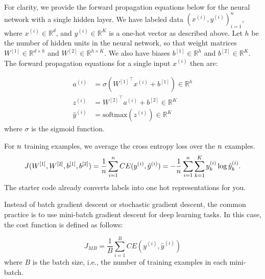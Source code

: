 For clarity, we provide the forward propagation equations below for the neural network with a single hidden layer. We have labeled data $(x^{(i)}, y^{(i)})_{i=1}^n$, where $x^{(i)} \in \mathbb{R}^d$, and $y^{(i)} \in \mathbb{R}^K$ is a one-hot vector as described above. Let $h$ be the number of hidden units in the neural network, so that weight matrices $W^{[1]} \in \mathbb{R}^{d \times h}$ and $W^{[2]} \in \mathbb{R}^{h \times K}$. We also have biases $b^{[1]} \in \mathbb{R}^h$ and $b^{[2]} \in \mathbb{R}^K$. The forward propagation equations for a single input $x^{(i)}$ then are:

\begin{align*}
  a^{(i)} &= \sigma \left( {W^{[1]}}^\top x^{(i)}  + b^{[1]} \right)  \in \mathbb{R}^h \\
  z^{(i) }&= {W^{[2]}}^\top a^{(i)} + b^{[2]} \in \mathbb{R}^K \\
  \hat{y}^{(i)} &=  \mathrm{softmax}(z^{(i)}) \in \mathbb{R}^K
\end{align*}
where $\sigma$ is the sigmoid function. 

For ${n}$ training examples, we average the cross entropy loss over the ${n}$ examples.
  \begin{equation*}
  J(W^{[1]},W^{[2]},b^{[1]},b^{[2]}) = \frac{1}{{n}}\sum_{i=1}^{n} CE(y^{(i)}, \hat{y}^{(i)}) = - \frac{1}{{n}}\sum_{i=1}^{n} \sum_{k=1}^K y_k^{(i)} \log \hat{y}_k^{(i)}.
  \end{equation*}
The starter code already converts labels into one hot representations for you.

Instead of batch gradient descent or stochastic gradient descent, the common practice
is to use mini-batch gradient descent for deep learning tasks. In this case, the
cost function is defined as follows:

  \begin{equation*}
  J_{MB} = \frac{1}{B}\sum_{i=1}^{B}CE(y^{(i)}, \hat{y}^{(i)})
  \end{equation*}
where $B$ is the batch size, i.e., the number of training examples in each mini-batch.

\begin{enumerate}
  

\ifnum{} {
  
} \fi

  

\ifnum{} {
  
} \fi

  

\ifnum{} {
  
} \fi


  
\ifnum{} {
  
} \fi

 \end{enumerate}

